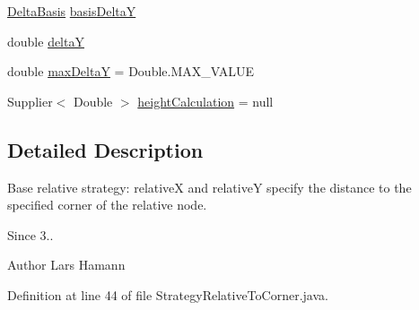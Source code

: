 \begin{DoxyCompactItemize}
\hyperlink{enumorg_1_1tzi_1_1use_1_1gui_1_1views_1_1diagrams_1_1elements_1_1positioning_1_1_strategy_relative_to_corner_1_1_delta_basis}{Delta\-Basis} \hyperlink{classorg_1_1tzi_1_1use_1_1gui_1_1views_1_1diagrams_1_1elements_1_1positioning_1_1_strategy_relative_to_corner_aa177ba1575520b8694de5ee1aa29ef3e}{basis\-Delta\-Y}
\item 
double \hyperlink{classorg_1_1tzi_1_1use_1_1gui_1_1views_1_1diagrams_1_1elements_1_1positioning_1_1_strategy_relative_to_corner_af4b5874cd6a14903ce78aa374f1b4b35}{delta\-Y}
\item 
double \hyperlink{classorg_1_1tzi_1_1use_1_1gui_1_1views_1_1diagrams_1_1elements_1_1positioning_1_1_strategy_relative_to_corner_a71c5ae9c9c648639397c5c06553f015a}{max\-Delta\-Y} = Double.\-M\-A\-X\-\_\-\-V\-A\-L\-U\-E
\item 
Supplier$<$ Double $>$ \hyperlink{classorg_1_1tzi_1_1use_1_1gui_1_1views_1_1diagrams_1_1elements_1_1positioning_1_1_strategy_relative_to_corner_af06c441591534e12fdd1f632f6614947}{height\-Calculation} = null
\end{DoxyCompactItemize}


\subsection{Detailed Description}
Base relative strategy\-: {\ttfamily relative\-X} and {\ttfamily relative\-Y} specify the distance to the specified corner of the relative node. \begin{DoxySince}{Since}
3.. 
\end{DoxySince}
\begin{DoxyAuthor}{Author}
Lars Hamann 
\end{DoxyAuthor}


Definition at line 44 of file Strategy\-Relative\-To\-Corner.\-java.



